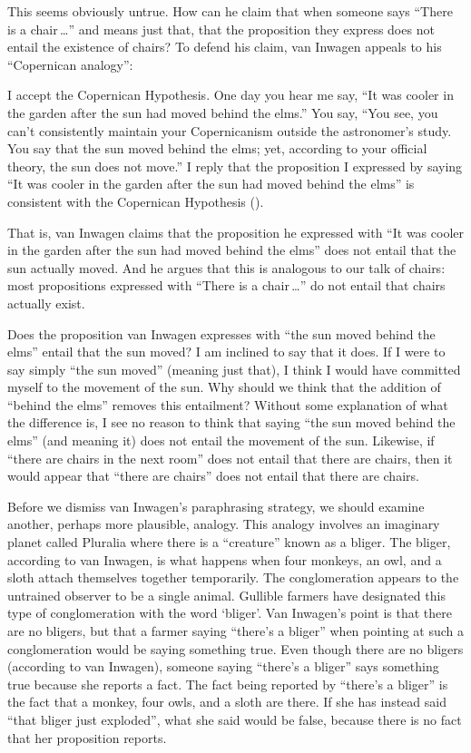 \documentclass[11pt]{article}
\newenvironment{squote}{%
\begin{spacing}{1}
\begin{list}{}{%
    \setlength{\labelwidth}{0pt}%
    \rightmargin\leftmargin%
  }
\item\relax
}{%
\end{list}%
\end{spacing}
}
\begin{document}
\begin{spacing}{1.5}
This seems obviously untrue.  How can he claim that when someone says
``There is a chair\,\ldots '' and means just that, that the
proposition they express does not entail the existence of chairs?  To
defend his claim, van Inwagen appeals to his ``Copernican analogy'':

\begin{squote}
I accept the Copernican Hypothesis.  One day you hear me say, ``It was
cooler in the garden after the sun had moved behind the elms.''  You
say, ``You see, you can't consistently maintain your Copernicanism
outside the astronomer's study.  You say that the sun moved behind the
elms; yet, according to your official theory, the sun does not move.''
I reply that the proposition I expressed by saying ``It was cooler in
the garden after the sun had moved behind the elms'' is consistent
with the Copernican Hypothesis (\citeyear[101]{inwagen1995}).
\end{squote}
That is, van Inwagen claims that the proposition he expressed with
``It was cooler in the garden after the sun had moved behind the
elms'' does not entail that the sun actually moved.  And he argues
that this is analogous to our talk of chairs: most propositions
expressed with ``There is a chair\,\ldots '' do not entail that chairs
actually exist.

Does the proposition van Inwagen expresses with ``the sun moved behind
the elms'' entail that the sun moved? I am inclined to say that it
does.  If I were to say simply ``the sun moved'' (meaning just that),
I think I would have committed myself to the movement of the sun.  Why
should we think that the addition of ``behind the elms'' removes this
entailment?  Without some explanation of what the difference is, I see
no reason to think that saying ``the sun moved behind the elms'' (and
meaning it) does not entail the movement of the sun.  Likewise, if
``there are chairs in the next room'' does not entail that there are
chairs, then it would appear that ``there are chairs'' does not entail
that there are chairs.

Before we dismiss van Inwagen's paraphrasing strategy, we should
examine another, perhaps more plausible, analogy.  This analogy
involves an imaginary planet called Pluralia where there is a
``creature'' known as a bliger.  The bliger, according to van Inwagen,
is what happens when four monkeys, an owl, and a sloth attach
themselves together temporarily.  The conglomeration appears to the
untrained observer to be a single animal.  Gullible farmers have
designated this type of conglomeration with the word `bliger'.  Van
Inwagen's point is that there are no bligers, but that a farmer saying
``there's a bliger'' when pointing at such a conglomeration would be
saying something true.  Even though there are no bligers (according to
van Inwagen), someone saying ``there's a bliger'' says something true
because she reports a fact.  The fact being reported by ``there's a
bliger'' is the fact that a monkey, four owls, and a sloth are there.
If she has instead said ``that bliger just exploded'', what she said
would be false, because there is no fact that her proposition reports.


\end{spacing}
\end{document}
